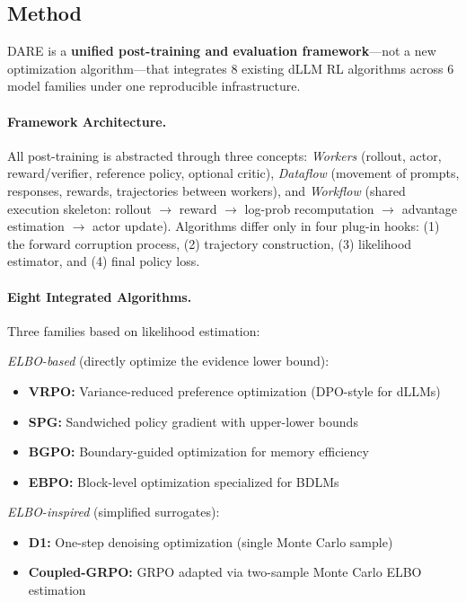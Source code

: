 \documentclass[11pt]{article}
\begin{document}
\subsection{Method}

DARE is a \textbf{unified post-training and evaluation framework}---not a new optimization algorithm---that integrates 8 existing dLLM RL algorithms across 6 model families under one reproducible infrastructure.

\paragraph{Framework Architecture.}
All post-training is abstracted through three concepts: \textit{Workers} (rollout, actor, reward/verifier, reference policy, optional critic), \textit{Dataflow} (movement of prompts, responses, rewards, trajectories between workers), and \textit{Workflow} (shared execution skeleton: rollout $\to$ reward $\to$ log-prob recomputation $\to$ advantage estimation $\to$ actor update). Algorithms differ only in four plug-in hooks: (1) the forward corruption process, (2) trajectory construction, (3) likelihood estimator, and (4) final policy loss.

\paragraph{Eight Integrated Algorithms.}
Three families based on likelihood estimation:

\textit{ELBO-based} (directly optimize the evidence lower bound):
\begin{itemize}
    \item \textbf{VRPO:} Variance-reduced preference optimization (DPO-style for dLLMs)
    \item \textbf{SPG:} Sandwiched policy gradient with upper-lower bounds
    \item \textbf{BGPO:} Boundary-guided optimization for memory efficiency
    \item \textbf{EBPO:} Block-level optimization specialized for BDLMs
\end{itemize}

\textit{ELBO-inspired} (simplified surrogates):
\begin{itemize}
    \item \textbf{D1:} One-step denoising optimization (single Monte Carlo sample)
    \item \textbf{Coupled-GRPO:} GRPO adapted via two-sample Monte Carlo ELBO estimation
\end{itemize}
\end{document}

